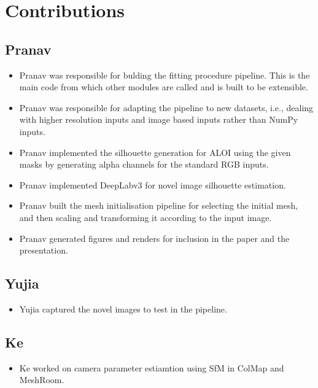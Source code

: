 \documentclass{article}
\begin{document}
\newpage
\section{Contributions}
\subsection{Pranav}

\begin{itemize}
  \item Pranav was responsible for bulding the fitting procedure pipeline. This is the main code from which other modules are called and is built to be extensible.

  \item Pranav was responsible for adapting the pipeline to new datasets, i.e., dealing with higher resolution inputs and image based inputs rather than NumPy inputs.
  
  \item Pranav implemented the silhouette generation for ALOI using the given masks by generating alpha channels for the standard RGB inputs.
  
  \item Pranav implemented DeepLabv3 for novel image silhouette estimation.
  
  \item Pranav built the mesh initialisation pipeline for selecting the initial mesh, and then scaling and transforming it according to the input image.
  
  \item Pranav generated figures and renders for inclusion in the paper and the presentation.
\end{itemize}

\subsection{Yujia}

\begin{itemize}
  \item Yujia captured the novel images to test in the pipeline.
\end{itemize}

\subsection{Ke}

\begin{itemize}
  \item Ke worked on camera parameter estiamtion using SfM in ColMap and MeshRoom.
\end{itemize}

\newpage
\printbibliography[
  heading=bibintoc,
  title={References}
]
\end{document}

